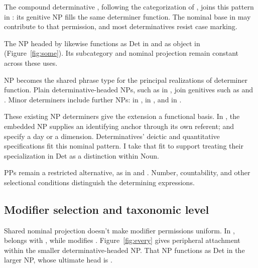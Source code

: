 \documentclass[12pt]{article}
\begin{document}
The compound determinative , following the categorization of \textcite[§1.3]{Payne2007}, joins this pattern in : its genitive NP fills the same determiner function. The nominal base in  may contribute to that permission, and most determinatives resist case marking.

The NP headed by  likewise functions as Det in  and as object in  (Figure~\ref{fig:some}). Its subcategory and nominal projection remain constant across these uses.

NP becomes the shared phrase type for the principal realizations of determiner function. Plain determinative-headed NPs, such as  in , join genitives such as  and . Minor determiners include further NPs:  in ,  in , and  in  \citep[356]{huddleston2002}.

These existing NP determiners give the extension a functional basis. In , the embedded NP supplies an identifying anchor through its own referent;  and  specify a day or a dimension. Determinatives' deictic and quantitative specifications fit this nominal pattern. I take that fit to support treating their specialization in Det as a distinction within Noun.

PPs remain a restricted alternative, as in  and  \citep[356]{huddleston2002}. Number, countability, and other selectional conditions distinguish the determining expressions.

\subsection{Modifier selection and taxonomic level}\label{sec:payne}

Shared nominal projection doesn't make modifier permissions uniform. In ,  belongs with , while  modifies . Figure~\ref{fig:every} gives  peripheral attachment within the smaller determinative-headed NP. That NP functions as Det in the larger NP, whose ultimate head is .
\end{document}
